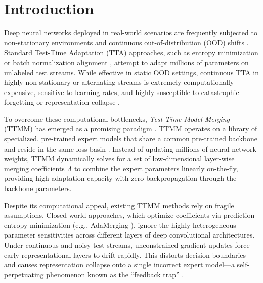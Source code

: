 \documentclass{article}
\theoremstyle{plain}
\theoremstyle{definition}
\theoremstyle{remark}
\begin{document}
\section{Introduction}
Deep neural networks deployed in real-world scenarios are frequently subjected to non-stationary environments and continuous out-of-distribution (OOD) shifts \cite{Wang2021, Doble2022, Song2023, Du2024}. Standard Test-Time Adaptation (TTA) approaches, such as entropy minimization \cite{Wang2021} or batch normalization alignment \cite{Schneider2020}, attempt to adapt millions of parameters on unlabeled test streams. While effective in static OOD settings, continuous TTA in highly non-stationary or alternating streams is extremely computationally expensive, sensitive to learning rates, and highly susceptible to catastrophic forgetting or representation collapse \cite{Yuan2023, Du2024}.

To overcome these computational bottlenecks, \emph{Test-Time Model Merging} (TTMM) has emerged as a promising paradigm \cite{Yang2024, MINGLE2025, LocalMoE2025}. TTMM operates on a library of specialized, pre-trained expert models that share a common pre-trained backbone and reside in the same loss basin \cite{Wortsman2022, Ainsworth2022, Yadav2023}. Instead of updating millions of neural network weights, TTMM dynamically solves for a set of low-dimensional layer-wise merging coefficients $\Lambda$ to combine the expert parameters linearly on-the-fly, providing high adaptation capacity with zero backpropagation through the backbone parameters.

Despite its computational appeal, existing TTMM methods rely on fragile assumptions. Closed-world approaches, which optimize coefficients via prediction entropy minimization (e.g., AdaMerging \cite{Yang2024}), ignore the highly heterogeneous parameter sensitivities across different layers of deep convolutional architectures. Under continuous and noisy test streams, unconstrained gradient updates force early representational layers to drift rapidly. This distorts decision boundaries and causes representation collapse onto a single incorrect expert model---a self-perpetuating phenomenon known as the ``feedback trap'' \cite{Submission8Paper}.
\end{document}
